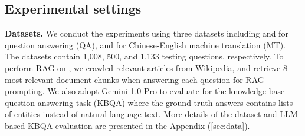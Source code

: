 



\subsection{Experimental settings}
\textbf{Datasets.} 
We conduct the experiments using three datasets including \webqsp \cite{yih2016value} and \ms
\cite{bajaj2016ms, huang2024performance} for question answering (QA), and \mac \cite{huang2025optimizing} for Chinese-English machine translation (MT). The datasets contain 1,008, 500, and 1,133 testing questions, respectively. To perform RAG on \webqsp, we crawled relevant articles from Wikipedia, and retrieve 8 most relevant document chunks when answering each question for RAG prompting. We also adopt Gemini-1.0-Pro to evaluate for the knowledge base question answering task (KBQA) where the ground-truth answers contains lists of entities instead of natural language text. More details of the dataset and LLM-based KBQA evaluation are presented in the Appendix (\ref{sec:data}). 


